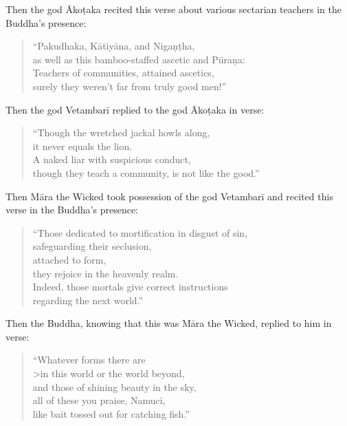 \documentclass[12pt,openany]{book}%
\begin{document}
Then the god \textsanskrit{Ākoṭaka} recited this verse about various sectarian teachers in the Buddha’s presence: 

\begin{verse}%
“Pakudhaka, \textsanskrit{Kātiyāna}, and \textsanskrit{Nigaṇṭha}, \\
as well as this bamboo-staffed ascetic and \textsanskrit{Pūraṇa}: \\
Teachers of communities, attained ascetics, \\
surely they weren’t far from truly good men!” 

%
\end{verse}

Then the god \textsanskrit{Vetambarī} replied to the god \textsanskrit{Ākoṭaka} in verse: 

\begin{verse}%
“Though the wretched jackal howls along, \\
it never equals the lion. \\
A naked liar with suspicious conduct, \\
though they teach a community, is not like the good.” 

%
\end{verse}

Then \textsanskrit{Māra} the Wicked took possession of the god \textsanskrit{Vetambarī} and recited this verse in the Buddha’s presence: 

\begin{verse}%
“Those dedicated to mortification in disgust of sin, \\
safeguarding their seclusion, \\
attached to form, \\
they rejoice in the heavenly realm. \\
Indeed, those mortals give correct instructions \\
regarding the next world.” 

%
\end{verse}

Then the Buddha, knowing that this was \textsanskrit{Māra} the Wicked, replied to him in verse: 

\begin{verse}%
“Whatever forms there are \\>in this world or the world beyond, \\
and those of shining beauty in the sky, \\
all of these you praise, Namuci, \\
like bait tossed out for catching fish.” 

%
\end{verse}
\end{document}
